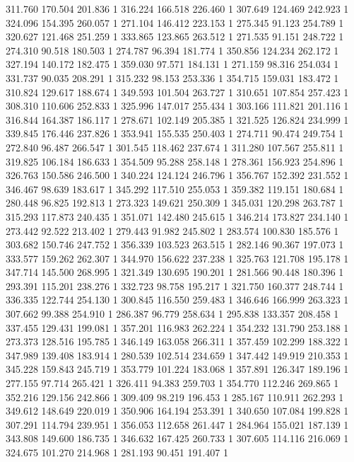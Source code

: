 	311.760	170.504	201.836	1
	316.224	166.518	226.460	1
	307.649	124.469	242.923	1
	324.096	154.395	260.057	1
	271.104	146.412	223.153	1
	275.345	91.123	254.789	1
	320.627	121.468	251.259	1
	333.865	123.865	263.512	1
	271.535	91.151	248.722	1
	274.310	90.518	180.503	1
	274.787	96.394	181.774	1
	350.856	124.234	262.172	1
	327.194	140.172	182.475	1
	359.030	97.571	184.131	1
	271.159	98.316	254.034	1
	331.737	90.035	208.291	1
	315.232	98.153	253.336	1
	354.715	159.031	183.472	1
	310.824	129.617	188.674	1
	349.593	101.504	263.727	1
	310.651	107.854	257.423	1
	308.310	110.606	252.833	1
	325.996	147.017	255.434	1
	303.166	111.821	201.116	1
	316.844	164.387	186.117	1
	278.671	102.149	205.385	1
	321.525	126.824	234.999	1
	339.845	176.446	237.826	1
	353.941	155.535	250.403	1
	274.711	90.474	249.754	1
	272.840	96.487	266.547	1
	301.545	118.462	237.674	1
	311.280	107.567	255.811	1
	319.825	106.184	186.633	1
	354.509	95.288	258.148	1
	278.361	156.923	254.896	1
	326.763	150.586	246.500	1
	340.224	124.124	246.796	1
	356.767	152.392	231.552	1
	346.467	98.639	183.617	1
	345.292	117.510	255.053	1
	359.382	119.151	180.684	1
	280.448	96.825	192.813	1
	273.323	149.621	250.309	1
	345.031	120.298	263.787	1
	315.293	117.873	240.435	1
	351.071	142.480	245.615	1
	346.214	173.827	234.140	1
	273.442	92.522	213.402	1
	279.443	91.982	245.802	1
	283.574	100.830	185.576	1
	303.682	150.746	247.752	1
	356.339	103.523	263.515	1
	282.146	90.367	197.073	1
	333.577	159.262	262.307	1
	344.970	156.622	237.238	1
	325.763	121.708	195.178	1
	347.714	145.500	268.995	1
	321.349	130.695	190.201	1
	281.566	90.448	180.396	1
	293.391	115.201	238.276	1
	332.723	98.758	195.217	1
	321.750	160.377	248.744	1
	336.335	122.744	254.130	1
	300.845	116.550	259.483	1
	346.646	166.999	263.323	1
	307.662	99.388	254.910	1
	286.387	96.779	258.634	1
	295.838	133.357	208.458	1
	337.455	129.431	199.081	1
	357.201	116.983	262.224	1
	354.232	131.790	253.188	1
	273.373	128.516	195.785	1
	346.149	163.058	266.311	1
	357.459	102.299	188.322	1
	347.989	139.408	183.914	1
	280.539	102.514	234.659	1
	347.442	149.919	210.353	1
	345.228	159.843	245.719	1
	353.779	101.224	183.068	1
	357.891	126.347	189.196	1
	277.155	97.714	265.421	1
	326.411	94.383	259.703	1
	354.770	112.246	269.865	1
	352.216	129.156	242.866	1
	309.409	98.219	196.453	1
	285.167	110.911	262.293	1
	349.612	148.649	220.019	1
	350.906	164.194	253.391	1
	340.650	107.084	199.828	1
	307.291	114.794	239.951	1
	356.053	112.658	261.447	1
	284.964	155.021	187.139	1
	343.808	149.600	186.735	1
	346.632	167.425	260.733	1
	307.605	114.116	216.069	1
	324.675	101.270	214.968	1
	281.193	90.451	191.407	1

